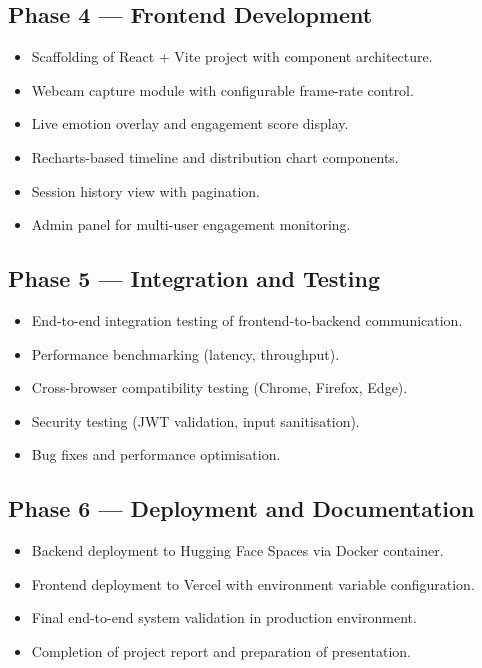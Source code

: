 \subsection{Phase 4 — Frontend Development}
\begin{itemize}
    \item Scaffolding of React + Vite project with component architecture.
    \item Webcam capture module with configurable frame-rate control.
    \item Live emotion overlay and engagement score display.
    \item Recharts-based timeline and distribution chart components.
    \item Session history view with pagination.
    \item Admin panel for multi-user engagement monitoring.
\end{itemize}

\subsection{Phase 5 — Integration and Testing}
\begin{itemize}
    \item End-to-end integration testing of frontend-to-backend communication.
    \item Performance benchmarking (latency, throughput).
    \item Cross-browser compatibility testing (Chrome, Firefox, Edge).
    \item Security testing (JWT validation, input sanitisation).
    \item Bug fixes and performance optimisation.
\end{itemize}

\subsection{Phase 6 — Deployment and Documentation}
\begin{itemize}
    \item Backend deployment to Hugging Face Spaces via Docker container.
    \item Frontend deployment to Vercel with environment variable configuration.
    \item Final end-to-end system validation in production environment.
    \item Completion of project report and preparation of presentation.
\end{itemize}

